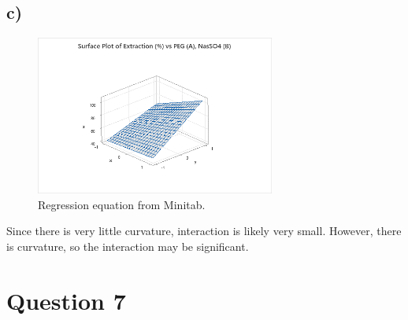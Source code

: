 \documentclass{article}
\begin{document}
\clearpage
\subsection*{c)}

\begin{figure}[h]
    \centering
    \includegraphics[width=0.7\textwidth]{./images/6_c.png}
    \caption{Regression equation from Minitab.}
    \label{fig:3_b_2}
\end{figure}

Since there is very little curvature, interaction is likely very small. However, there is curvature, so the interaction may be significant.
\clearpage
\section*{Question 7}
\end{document}
